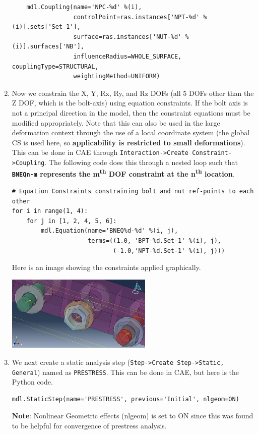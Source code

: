 \documentclass[11pt]{article}
\begin{document}
\begin{enumerate}
\begin{verbatim}
    mdl.Coupling(name='NPC-%d' %(i),
                 controlPoint=ras.instances['NPT-%d' %(i)].sets['Set-1'],
                 surface=ras.instances['NUT-%d' %(i)].surfaces['NB'],
                 influenceRadius=WHOLE_SURFACE, couplingType=STRUCTURAL,
                 weightingMethod=UNIFORM)
\end{verbatim}
\item Now we constrain the X, Y, Rx, Ry, and Rz DOFs (all 5 DOFs other than the Z DOF, which is the bolt-axis) using equation constraints.
If the bolt axis is not a principal direction in the model, then the constraint equations must be modified appropriately.
Note that this can also be used in the large deformation context through the use of a local coordinate system (the global CS is used here, so \textbf{applicability is restricted to small deformations}).
This can be done in CAE through \texttt{Interaction->Create Constraint->Coupling}.
The following code does this through a nested loop such that \textbf{\texttt{BNEQn-m}  represents the m\textsuperscript{th} DOF constraint at the n\textsuperscript{th} location}.
\begin{verbatim}
# Equation Constraints constraining bolt and nut ref-points to each other
for i in range(1, 4):
    for j in [1, 2, 4, 5, 6]:
        mdl.Equation(name='BNEQ%d-%d' %(i, j),
                     terms=((1.0, 'BPT-%d.Set-1' %(i), j),
                            (-1.0,'NPT-%d.Set-1' %(i), j)))
\end{verbatim}
Here is an image showing the constraints applied graphically.
\begin{center}
\includegraphics[width=0.55\textwidth]{./figs/conss.png}
\end{center}
\item We next create a static analysis step (\texttt{Step->Create Step->Static, General}) named as \texttt{PRESTRESS}.
This can be done in CAE, but here is the Python code.
\begin{verbatim}
mdl.StaticStep(name='PRESTRESS', previous='Initial', nlgeom=ON)
\end{verbatim}
\textbf{Note}: Nonlinear Geometric effects (nlgeom) is set to ON since this was found to be helpful for convergence of prestress analysis.

\end{enumerate}
\end{document}
